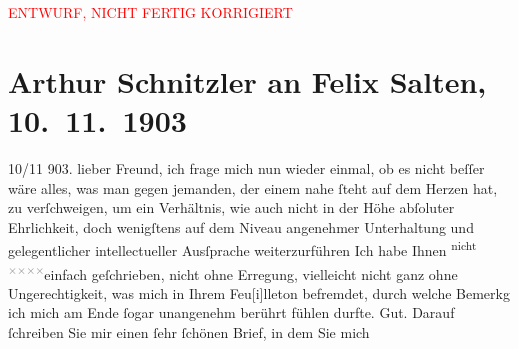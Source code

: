
\begin{center}
            \textcolor{red}{ENTWURF, NICHT FERTIG KORRIGIERT}
                      \end{center}
            
         
         \renewcommand{\erwaehntePersonen}{Personen: Felix Salten}
         \renewcommand{\erwaehnteOrte}{Orte: Wien}
         \renewcommand{\erwaehnteWerke}{Werke: Arthur Schnitzler und sein »Reigen«}
               \section[Arthur Schnitzler an Felix Salten, 10. 11. 1903]{ Arthur Schnitzler an Felix Salten, 10. 11. 1903}\nopagebreak{}\rehead{ }\begin{ledgroupsized}[t]{13cm}\normalsize\beginnumbering \toendnotes[C]{\smallbreak\pagebreak[2]} 
\toendnotes[C]{\smallbreak}\pstart
           \raggedleft{}{\pb}10/11 903.\pend
           \pstart
           lieber Freund, ich frage mich nun wieder einmal, ob es nicht beſſer
               wäre alles, was man gegen jemanden, der einem nahe ſteht auf dem Herzen hat, zu
               verſchweigen, um ein Verhältnis, wie auch nicht in der Höhe abſoluter Ehrlichkeit,
               doch wenigſtens auf dem Niveau angenehmer Unterhaltung {\pb}und gelegentlicher intellectueller Ausſprache
                  weiterzurführen{\dotstwo} Ich habe Ihnen \substVorne{}\textsuperscript{nicht \textcolor{gray}{×}\-\textcolor{gray}{×}\-\textcolor{gray}{×}\-\textcolor{gray}{×}}{\allowbreak}\substDazwischen{}einfach geſchrie\substHinten{}ben, nicht ohne Erregung, vielleicht nicht ganz ohne Ungerechtigkeit, was
               mich in Ihrem Feu{[}i{]}lleton befremdet, durch welche Bemerkg ich mich
               am Ende ſogar unangenehm berührt fühlen durfte. Gut. Darauf ſchreiben Sie mir einen
               ſehr {\pb}ſchönen Brief, in dem Sie mich

\end{ledgroupsized}
